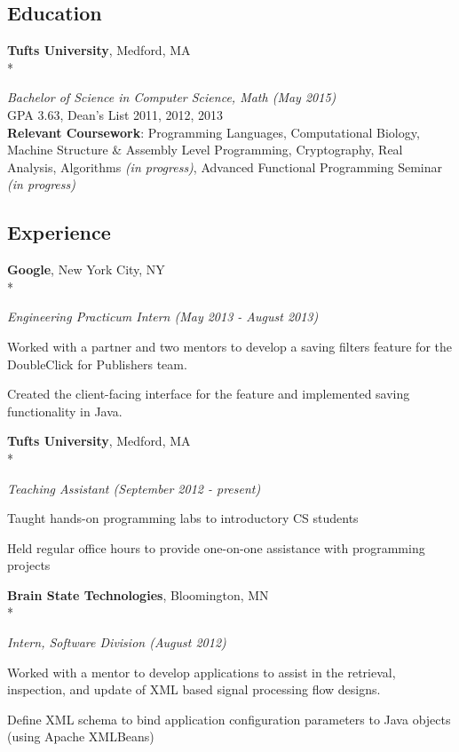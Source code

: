 \documentclass{article}
\newcommand{\position}[2]{
  \textit{#1 (#2)}
}
\newcommand{\affiliation}[2]{
  \textbf{#1}, #2 \\*
}
\newenvironment{achievements}{
  \begin{compactitem} }{
  \end{compactitem}
}
\newcommand{\skill}[2]{
  \textbf{#1}: #2
  \smallskip
}
\begin{document}
\subsection*{Education}
  \affiliation{Tufts University}                             {Medford, MA}
    \position{Bachelor of Science in Computer Science, Math} {May 2015} \\
  GPA 3.63, Dean's List 2011, 2012, 2013 \\
  \skill{Relevant Coursework}
        {Programming Languages, Computational Biology, Machine Structure \&
        Assembly Level Programming, Cryptography, Real Analysis, Algorithms
        \textit{(in progress)}, Advanced Functional Programming Seminar
        \textit{(in progress)}}

\subsection*{Experience}
  \affiliation{Google}                       {New York City, NY}
    \position {Engineering Practicum Intern} {May 2013 - August 2013}
    \begin{achievements}
      \item Worked with a partner and two mentors to develop a
            saving filters feature for the \\ DoubleClick for Publishers team.
      \item Created the client-facing interface for the feature and
      implemented saving functionality in Java.
    \end{achievements}
    \smallskip

  \affiliation{Tufts University}   {Medford, MA}
    \position {Teaching Assistant} {September 2012 - present}
    \begin{achievements}
      \item Taught hands-on programming labs to introductory CS students
      \item Held regular office hours to provide one-on-one assistance with
            programming projects
    \end{achievements}
    \smallskip

  \affiliation{Brain State Technologies}  {Bloomington, MN}
    \position {Intern, Software Division} {August 2012}
    \begin{achievements}
      \item Worked with a mentor to develop applications to assist in the
            retrieval, inspection, and update of XML based signal processing 
            flow designs.
      \item Define XML schema to bind application configuration parameters to 
            Java objects (using Apache XMLBeans)
    \end{achievements}
\end{document}

